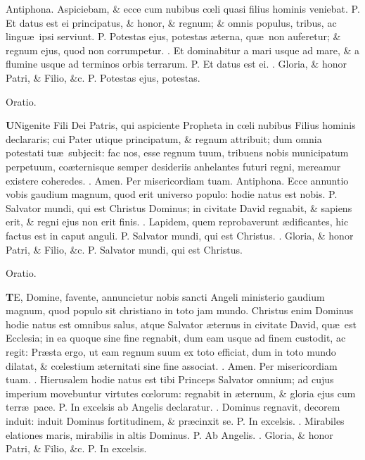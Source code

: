 \documentclass[letter,11pt]{book}
\makeatletter
\DeclareRobustCommand{\Vbar}{\vers@resp{-0.1em}{V}}
\DeclareRobustCommand{\Rbar}{\vers@resp{0pt}{R}}
\newcommand{\vers@resp@sym}{\raisebox{0.2ex}{\rotatebox[origin=c]{-20}{$\m@th\rceil$}}}
\newcommand{\vers@resp}[2]{%
  {\ooalign{\hidewidth\kern#1\vers@resp@sym\hidewidth\cr#2\cr}}%
}%
\def\P{\color{Red} P. \color{black}}
\def\V{\color{Red} \Vbar . \color{black}}
\def\R{\color{Red} \Rbar . \color{black}}
\makeatother
\begin{document}
\begin{multicols*}{2}
\newline \color{Red} Antiphona. \color{black} Aspiciebam, \& ecce cum nubibus
c\oe li quasi filius hominis veniebat. \P Et datus est ei principatus, \& honor, \& regnum; \& omnis populus, tribus, ac lingu\ae \ ipsi serviunt. \P Potestas ejus, potestas \ae terna, qu\ae \ non auferetur; \& regnum ejus, quod non corrumpetur. \V Et dominabitur a mari usque ad mare, \& a flumine usque ad terminos orbis terrarum. \P Et datus est ei. \V Gloria, \& honor Patri, \& Filio, \&c. \P Potestas ejus, potestas.
\vspace{-.5em} \begin{center} \color{Red} Oratio. \color{black} \end{center} \vspace{-.5em}
\lettrine[lines=2]{\bfseries \color{Red} U}{}Nigenite Fili Dei Patris, qui aspiciente Propheta in c\oe li nubibus Filius hominis declararis; cui Pater utique principatum, \& regnum attribuit; dum omnia potestati tu\ae \ subjecit: fac nos, esse regnum tuum, tribuens nobis municipatum perpetuum, co\ae ternisque semper desideriis anhelantes futuri regni, mereamur existere coheredes. \R Amen. Per misericordiam tuam.
\newline \color{Red} Antiphona. \color{black} Ecce annuntio vobis gaudium magnum, quod erit universo populo: hodie natus est nobis. \P Salvator mundi, qui est Christus Dominus; in civitate David regnabit, \& sapiens erit, \& regni ejus non erit finis. \V Lapidem, quem reprobaverunt \ae dificantes, hic factus est in caput anguli. \P Salvator mundi, qui est Christus. \V Gloria, \& honor Patri, \& Filio, \&c. \P Salvator mundi, qui est Christus.
\vspace{-.5em} \begin{center} \color{Red} Oratio. \color{black} \end{center} \vspace{-.5em}
\lettrine[lines=2]{\bfseries \color{Red} T}{}E, Domine, favente, annuncietur nobis sancti Angeli ministerio gaudium magnum, quod populo sit christiano in toto jam mundo. Christus enim Dominus hodie natus est omnibus salus, atque Salvator \ae ternus in civitate David, qu\ae \ est Ecclesia; in ea quoque sine fine regnabit, dum eam usque ad finem custodit, ac regit: Pr\ae sta ergo, ut eam regnum suum ex toto efficiat, dum in toto mundo dilatat, \& c\oe lestium \ae ternitati sine fine associat. \R Amen. Per misericordiam tuam.
\newline \R Hierusalem hodie natus est tibi Princeps Salvator omnium; ad cujus imperium movebuntur virtutes c\oe lorum: regnabit in \ae ternum, \& gloria ejus cum terr\ae \ pace. \P In excelsis ab Angelis declaratur. \V Dominus regnavit, decorem induit: induit Dominus fortitudinem, \& pr\ae cinxit se. \P In excelsis. \V Mirabiles elationes maris, mirabilis in altis Dominus. \P Ab Angelis. \V Gloria, \& honor Patri, \& Filio, \&c. \P In excelsis.

\end{multicols*}
\end{document}
